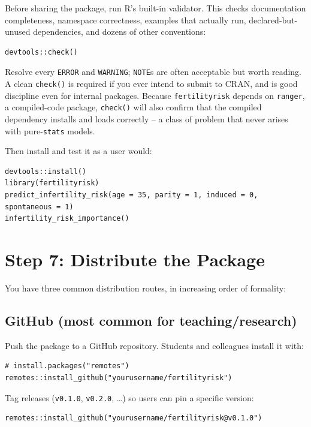 \documentclass[11pt]{article}
\begin{document}
Before sharing the package, run R's built-in validator. This checks documentation completeness, namespace correctness, examples that actually run, declared-but-unused dependencies, and dozens of other conventions:

\begin{lstlisting}
devtools::check()
\end{lstlisting}

Resolve every \texttt{ERROR} and \texttt{WARNING}; \texttt{NOTE}s are often acceptable but worth reading. A clean \texttt{check()} is required if you ever intend to submit to CRAN, and is good discipline even for internal packages. Because \texttt{fertilityrisk} depends on \texttt{ranger}, a compiled-code package, \texttt{check()} will also confirm that the compiled dependency installs and loads correctly -- a class of problem that never arises with pure-\texttt{stats} models.

Then install and test it as a user would:

\begin{lstlisting}
devtools::install()
library(fertilityrisk)
predict_infertility_risk(age = 35, parity = 1, induced = 0, spontaneous = 1)
infertility_risk_importance()
\end{lstlisting}

\section{Step 7: Distribute the Package}

You have three common distribution routes, in increasing order of formality:

\subsection{GitHub (most common for teaching/research)}
Push the package to a GitHub repository. Students and colleagues install it with:

\begin{lstlisting}
# install.packages("remotes")
remotes::install_github("yourusername/fertilityrisk")
\end{lstlisting}

Tag releases (\texttt{v0.1.0}, \texttt{v0.2.0}, \dots) so users can pin a specific version:

\begin{lstlisting}
remotes::install_github("yourusername/fertilityrisk@v0.1.0")
\end{lstlisting}
\end{document}
